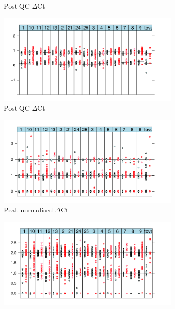 \begin{figure}[!h]
\begin{subfigure}[b]{.4\textwidth}
    \caption{Post-QC  $\Delta$Ct}
    \label{}
    \end{subfigure}
    \begin{subfigure}[b]{.4\textwidth}
    \includegraphics[scale=.5] {figures/KIR3DL1-postQC.pdf}
    \caption{Post-QC  $\Delta$Ct}
    \label{}
    \end{subfigure}
    \begin{subfigure}[b]{.4\textwidth}
    \includegraphics[scale=.5] {figures/KIR3DS1-peaknormalised.pdf}
    \caption{Peak normalised  $\Delta$Ct}
    \label{}
    \end{subfigure}
    \hspace{3cm}
    \begin{subfigure}[b]{.4\textwidth}
    \includegraphics[scale=.5] {figures/KIR3DL1-peaknormalised.pdf}

\end{subfigure}
\end{figure}
